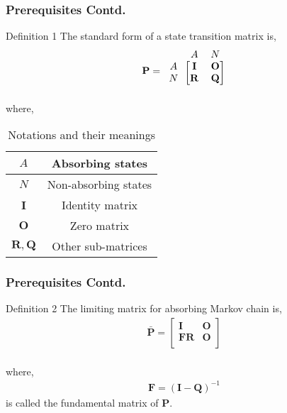 \documentclass{beamer}
\renewcommand{\vec}[1]{\mathbf{#1}}
\let\vec\mathbf
\begin{document}
\begin{frame}
    \frametitle{Prerequisites Contd.}
     \begin{block}{Definition 1}
         The standard form of a state transition matrix is,
         \begin{align}
   \vec{P}=\begin{blockarray}{ccc}
&A & N \\
\begin{block}{c[cc]}
  A & \vec{I} & \vec{O}  \\
  N & \vec{R} & \vec{Q} \\
\end{block}
\end{blockarray}
\label{eq3}
\end{align}
where,
\begin{table}[h!]
\centering
\caption{Notations and their meanings}
\label{table:3}
\begin{tabular}{|c|c|}
    \hline
    $A$ & Absorbing states\\[1ex]
    \hline
    $N$ & Non-absorbing states \\[1ex]
    \hline
    $\vec{I}$ & Identity matrix\\[1ex]
    \hline
    $\vec{O}$ & Zero matrix\\[1ex]
    \hline
    $\vec{R},\vec{Q}$ & Other sub-matrices\\[1ex]
    \hline
\end{tabular}
\end{table}
\end{block}
\end{frame}
\begin{frame}
    \frametitle{Prerequisites Contd.}
    \begin{block}{Definition 2}
      The limiting matrix for absorbing Markov chain is,
\begin{align}
    \vec{\bar P}=\begin{bmatrix}
    \vec{I} & \vec{O}\\
    \vec{FR} & \vec{O}\\
    \end{bmatrix}
    \label{eq4}
\end{align}
\\where,
\begin{align}
    \vec{F}=(\vec{I}-\vec{Q})^{-1}
    \label{eq5}
\end{align}
is called the fundamental matrix of $\vec{P}$. \\
    \end{block}
\end{frame}
\end{document}
